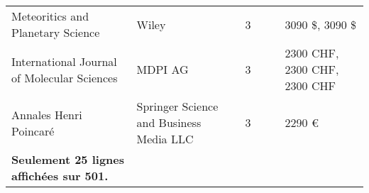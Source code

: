\begin{longtable}{p{.27\linewidth}P{.18\linewidth}P{.07\linewidth}P{.12\linewidth}P{.12\linewidth}P{.07\linewidth}}
Meteoritics and Planetary Science & Wiley & 3 &    &    & 3090 \$, 3090 \$ \\
International Journal of Molecular Sciences & MDPI AG & 3 &    &    & 2300 CHF, 2300 CHF, 2300 CHF \\
Annales Henri Poincaré & Springer Science and Business Media LLC & 3 &    &    & 2290 € \\
\textbf{Seulement 25 lignes affichées sur 501.} \\
\bottomrule
\end{longtable}
